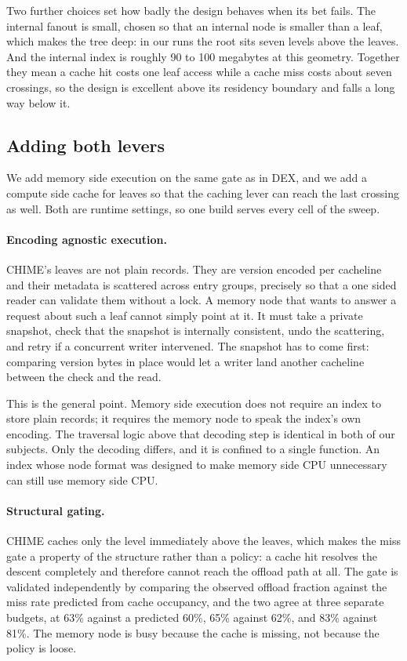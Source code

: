 \documentclass[sigconf,nonacm]{acmart}
\begin{document}
Two further choices set how badly the design behaves when its bet fails. The
internal fanout is small, chosen so that an internal node is smaller than a leaf,
which makes the tree deep: in our runs the root sits seven levels above the
leaves. And the internal index is roughly 90 to 100 megabytes at this geometry.
Together they mean a cache hit costs one leaf access while a cache miss costs
about seven crossings, so the design is excellent above its residency boundary and
falls a long way below it.

\subsection{Adding both levers}
\label{sec:chime:add}

We add memory side execution on the same gate as in DEX, and we add a compute
side cache for leaves so that the caching lever can reach the last crossing as
well. Both are runtime settings, so one build serves every cell of the sweep.

\paragraph{Encoding agnostic execution.}
CHIME's leaves are not plain records. They are version encoded per cacheline and
their metadata is scattered across entry groups, precisely so that a one sided
reader can validate them without a lock. A memory node that wants to answer a
request about such a leaf cannot simply point at it. It must take a private
snapshot, check that the snapshot is internally consistent, undo the scattering,
and retry if a concurrent writer intervened. The snapshot has to come first:
comparing version bytes in place would let a writer land another cacheline between
the check and the read.

This is the general point. Memory side execution does not require an index to
store plain records; it requires the memory node to speak the index's own
encoding. The traversal logic above that decoding step is identical in both of our
subjects. Only the decoding differs, and it is confined to a single function. An
index whose node format was designed to make memory side CPU unnecessary can still
use memory side CPU.

\paragraph{Structural gating.}
CHIME caches only the level immediately above the leaves, which makes the miss
gate a property of the structure rather than a policy: a cache hit resolves the
descent completely and therefore cannot reach the offload path at all. The gate
is validated independently by comparing the observed offload fraction against the
miss rate predicted from cache occupancy, and the two agree at three separate
budgets, at 63\% against a predicted 60\%, 65\% against 62\%, and 83\% against
81\%. The memory node is busy because the cache is missing, not because the policy
is loose.
\end{document}
